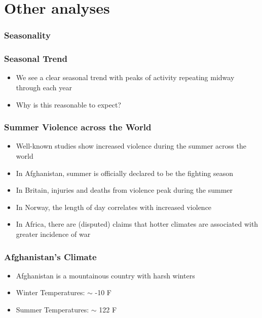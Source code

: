 \documentclass[xcolor=dvipsnames, 9pt]{beamer}
\begin{document}

\section{Other analyses} %
\label{sec:other_analyses}

\begin{frame}[fragile]
  \frametitle{Seasonality}
  \begin{center}
  \end{center}
\end{frame}

\begin{frame}[fragile]
  \frametitle{Seasonal Trend}
  \begin{itemize}
    \item{We see a clear seasonal trend with peaks of activity repeating midway through each year}
    \item{Why is this reasonable to expect?}
  \end{itemize}
\end{frame}

\begin{frame}[fragile]
  \frametitle{Summer Violence across the World}
  \begin{itemize}
    \item{Well-known studies show increased violence during the summer across the world}
    \item{In Afghanistan, summer is officially declared to be the fighting season}
    \item{In Britain, injuries and deaths from violence peak during the summer}
    \item{In Norway, the length of day correlates with increased violence}
    \item{In Africa, there are (disputed) claims that hotter climates are associated with greater incidence of war}
  \end{itemize}
\end{frame}

\begin{frame}[fragile]
  \frametitle{Afghanistan's Climate}
  \begin{itemize}
    \item{Afghanistan is a mountainous country with harsh winters}
    \item{Winter Temperatures: $\sim$ -10 F}
    \item{Summer Temperatures: $\sim$ 122 F}
  \end{itemize}
\end{frame}
\end{document}
